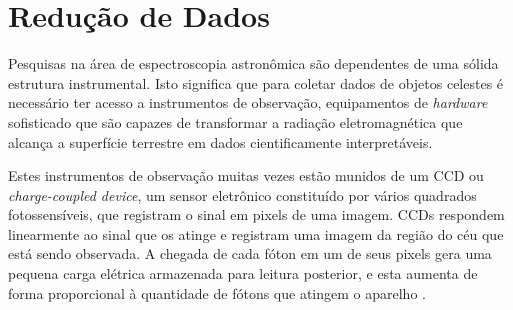 
\section{Redução de Dados}\label{data-reduction}

Pesquisas na área de espectroscopia astronômica são dependentes de uma sólida estrutura instrumental. Isto significa que para coletar dados de objetos celestes é necessário ter acesso a instrumentos de observação, equipamentos de \textit{hardware} sofisticado que são capazes de transformar a radiação eletromagnética que alcança a superfície terrestre em dados cientificamente interpretáveis.

Estes instrumentos de observação muitas vezes estão munidos de um CCD ou \textit{charge-coupled device}, um sensor eletrônico constituído por vários quadrados fotossensíveis, que registram o sinal em pixels de uma imagem. CCDs respondem linearmente ao sinal que os atinge e registram uma imagem da região do céu que está sendo observada. A chegada de cada fóton em um de seus pixels gera uma pequena carga elétrica armazenada para leitura posterior, e esta aumenta de forma proporcional à quantidade de fótons que atingem o aparelho \citep{davenhall20012}.

